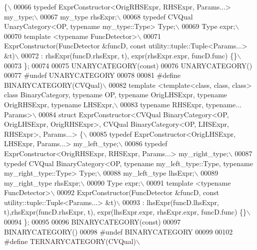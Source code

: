 \begin{DoxyCode}
{       \{\(\backslash\)}
00066 \textcolor{preprocessor}{  typedef  ExprConstructor<OrigRHSExpr, RHSExpr, Params...> my\_type;\(\backslash\)}
00067 \textcolor{preprocessor}{  my\_type rhsExpr;\(\backslash\)}
00068 \textcolor{preprocessor}{  typedef CVQual UnaryCategory<OP, typename my\_type::Type> Type;\(\backslash\)}
00069 \textcolor{preprocessor}{  Type expr;\(\backslash\)}
00070 \textcolor{preprocessor}{  template <typename FuncDetector>\(\backslash\)}
00071 \textcolor{preprocessor}{  ExprConstructor(FuncDetector &funcD, const utility::tuple::Tuple<Params...> &t)\(\backslash\)}
00072 \textcolor{preprocessor}{  : rhsExpr(funcD.rhsExpr, t), expr(rhsExpr.expr, funcD.func) \{\}\(\backslash\)}
00073 \textcolor{preprocessor}{\};}
00074 
00075 UNARYCATEGORY(\textcolor{keyword}{const})
00076 UNARYCATEGORY()
00077 \textcolor{preprocessor}{#undef UNARYCATEGORY}
00078 
00081 \textcolor{preprocessor}{#define BINARYCATEGORY(CVQual)\(\backslash\)}
00082 \textcolor{preprocessor}{template <template<class, class, class> class BinaryCategory, typename OP, typename OrigLHSExpr, typename
       OrigRHSExpr, typename LHSExpr,\(\backslash\)}
00083 \textcolor{preprocessor}{typename RHSExpr, typename... Params>\(\backslash\)}
00084 \textcolor{preprocessor}{struct ExprConstructor<CVQual BinaryCategory<OP, OrigLHSExpr, OrigRHSExpr>,  CVQual BinaryCategory<OP,
       LHSExpr, RHSExpr>, Params...> \{\(\backslash\)}
00085 \textcolor{preprocessor}{  typedef  ExprConstructor<OrigLHSExpr, LHSExpr, Params...> my\_left\_type;\(\backslash\)}
00086 \textcolor{preprocessor}{  typedef  ExprConstructor<OrigRHSExpr, RHSExpr, Params...> my\_right\_type;\(\backslash\)}
00087 \textcolor{preprocessor}{  typedef  CVQual BinaryCategory<OP, typename my\_left\_type::Type, typename my\_right\_type::Type> Type;\(\backslash\)}
00088 \textcolor{preprocessor}{  my\_left\_type lhsExpr;\(\backslash\)}
00089 \textcolor{preprocessor}{  my\_right\_type rhsExpr;\(\backslash\)}
00090 \textcolor{preprocessor}{  Type expr;\(\backslash\)}
00091 \textcolor{preprocessor}{  template <typename FuncDetector>\(\backslash\)}
00092 \textcolor{preprocessor}{  ExprConstructor(FuncDetector &funcD, const utility::tuple::Tuple<Params...> &t)\(\backslash\)}
00093 \textcolor{preprocessor}{  : lhsExpr(funcD.lhsExpr, t),rhsExpr(funcD.rhsExpr, t), expr(lhsExpr.expr, rhsExpr.expr, funcD.func) \{\}\(\backslash\)}
00094 \textcolor{preprocessor}{\};}
00095 
00096 BINARYCATEGORY(\textcolor{keyword}{const})
00097 BINARYCATEGORY()
00098 \textcolor{preprocessor}{#undef BINARYCATEGORY}
00099 
00102 \textcolor{preprocessor}{#define TERNARYCATEGORY(CVQual)\(\backslash\)}

\end{DoxyCode}
